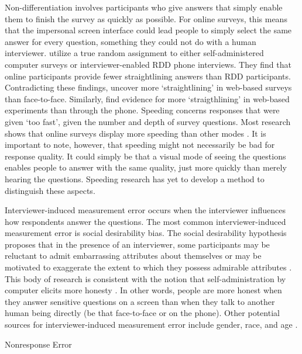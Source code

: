 \documentclass[12pt,]{article}
\makeatletter
\renewcommand\paragraph{\@startsection{paragraph}{4}{\z@}
                                    {-3.25ex \@plus -1ex \@minus -.2ex}
                                    {1.5ex \@plus .2ex}
                                    {\normalsize}} %
\makeatother
\begin{document}
Non-differentiation involves participants who give answers that simply
enable them to finish the survey as quickly as possible. For online
surveys, this means that the impersonal screen interface could lead
people to simply select the same answer for every question, something
they could not do with a human interviewer. \citet{chang_2010_comparing}
utilize a true random assignment to either self-administered computer
surveys or interviewer-enabled RDD phone interviews. They find that
online participants provide fewer straightlining answers than RDD
participants. Contradicting these findings,
\citet{heerwegh_2008_face-to-face} uncover more `straightlining' in
web-based surveys than face-to-face. Similarly,
\citet{fricker_2005_experimental} find evidence for more
`straigthlining' in web-based experiments than through the phone.
Speeding concerns responses that were given `too fast', given the number
and depth of survey questions. Most research shows that online surveys
display more speeding than other modes
\citep{chang_2010_comparing, miller_2000_phone, heerwegh_2008_face-to-face, greszki_2015_exploring}.
It is important to note, however, that speeding might not necessarily be
bad for response quality. It could simply be that a visual mode of
seeing the questions enables people to answer with the same quality,
just more quickly than merely hearing the questions. Speeding research
has yet to develop a method to distinguish these aspects.

Interviewer-induced measurement error occurs when the interviewer
influences how respondents answer the questions. The most common
interviewer-induced measurement error is social desirability bias. The
social desirability hypothesis proposes that in the presence of an
interviewer, some participants may be reluctant to admit embarrassing
attributes about themselves or may be motivated to exaggerate the extent
to which they possess admirable attributes
\citep{chang_2010_comparing, rogers_2001_using}. This body of research
is consistent with the notion that self-administration by computer
elicits more honesty \citep{kreuter_2008_social}. In other words, people
are more honest when they answer sensitive questions on a screen than
when they talk to another human being directly (be that face-to-face or
on the phone). Other potential sources for interviewer-induced
measurement error include gender, race, and age
\citep{huddy_1997_effect, rooney_2005_effects, tourangeau_2007_sensitive, warnecke_1997_improving, yan_2008_fast}.

\paragraph{Nonresponse Error}\label{mode-theory-types-nonresponse}
\end{document}
